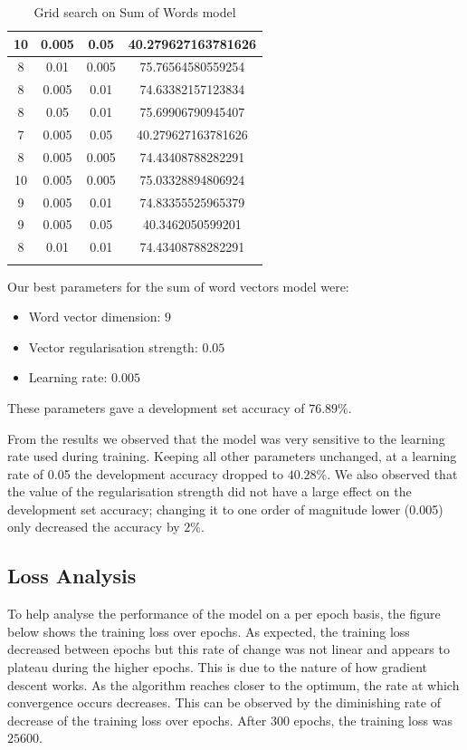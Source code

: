 \documentclass{article} %
\begin{document}
\begin{table}[htb]
{\begin{tabular}{|c|c|c|c|}
10 & 0.005 & 0.05 & 40.279627163781626 \\ \hline
8 & 0.01 & 0.005 & 75.76564580559254 \\ \hline
8 & 0.005 & 0.01 & 74.63382157123834 \\ \hline
8 & 0.05 & 0.01 & 75.69906790945407 \\ \hline
7 & 0.005 & 0.05 & 40.279627163781626 \\ \hline
8 & 0.005 & 0.005 & 74.43408788282291 \\ \hline
10 & 0.005 & 0.005 & 75.03328894806924 \\ \hline
9 & 0.005 & 0.01 & 74.83355525965379 \\ \hline
9 & 0.005 & 0.05 & 40.3462050599201 \\ \hline
8 & 0.01 & 0.01 & 74.43408788282291 \\	 \hline
\label{mainresults}
\end{tabular}
}
\caption{Grid search on Sum of Words model}
\end{table}

Our best parameters for the sum of word vectors model were:

\begin{itemize}

\item Word vector dimension: $9$
\item Vector regularisation strength: $0.05$
\item Learning rate: $0.005$

\end{itemize}

These parameters gave a development set accuracy of $76.89\%$.

From the results we observed that the model was very sensitive to the learning rate used during training. Keeping all other parameters unchanged, at a learning rate of 0.05 the development accuracy dropped to $40.28\%$. We also observed that the value of the regularisation strength did not have a large effect on the development set accuracy; changing it to one order of magnitude lower (0.005) only decreased the accuracy by $2\%$.

\subsection{Loss Analysis}

To help analyse the performance of the model on a per epoch basis, the figure below shows the training loss over epochs. As expected, the training loss decreased between epochs but this rate of change was not linear and appears to plateau during the higher epochs. This is due to the nature of how gradient descent works. As the algorithm reaches closer to the optimum, the rate at which convergence occurs decreases. This can be observed by the diminishing rate of decrease of the training loss over epochs. After 300 epochs, the training loss was $25600$.
\end{document}
